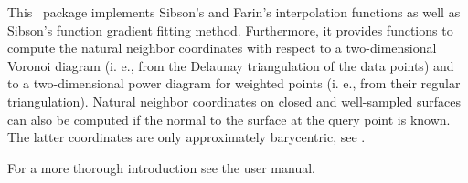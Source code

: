 This \cgal\ package implements Sibson's and Farin's interpolation
functions as well as Sibson's function gradient fitting method.
Furthermore, it provides functions to compute the natural neighbor
coordinates with respect to a two-dimensional Voronoi diagram (i. e., 
from the Delaunay triangulation of the data points) and to a
two-dimensional power diagram for weighted points (i. e., from their
regular triangulation).  Natural neighbor coordinates on closed and
well-sampled surfaces can also be computed if the normal to the
surface at the query point is known. The latter coordinates are only
approximately barycentric, see \cite{bf-lcss-02}.

For a more thorough introduction see the user manual.

\\
\\


 \\
 \\
 \\
 \\
 \\

 \\
 \\

 \\
 \\

\\
 \\
\clearpage

